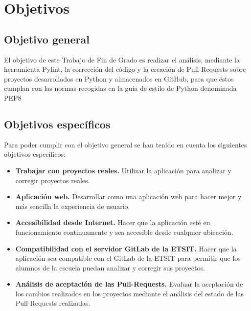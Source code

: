 \documentclass[a4paper, 12pt]{book}
\begin{document}

\cleardoublepage %
\chapter{Objetivos} %
\label{chap:objetivos} %

\section{Objetivo general} %
\label{sec:objetivo-general} %

El objetivo de este Trabajo de Fin de Grado es realizar el análisis, mediante la herramienta Pylint, la corrección del código y la creación de Pull-Requests sobre proyectos desarrollados en Python y almacenados en GitHub, para que éstos cumplan con las normas recogidas en la guía de estilo de Python denominada PEP8

\section{Objetivos específicos}
\label{sec:objetivos-especificos}

Para poder cumplir con el objetivo general se han tenido en cuenta los siguientes objetivos específicos:

\begin{itemize}
	\item \textbf{Trabajar con proyectos reales.} Utilizar la aplicación para analizar y corregir proyectos reales.
	\item \textbf{Aplicación web.} Desarrollar como una aplicación web para hacer mejor y más sencilla la experiencia de usuario.
	\item \textbf{Accesibilidad desde Internet.} Hacer que la aplicación esté en funcionamiento continuamente y sea accesible desde cualquier ubicación.
	\item \textbf{Compatibilidad con el servidor GitLab de la ETSIT.} Hacer que la aplicación sea compatible con el GitLab de la ETSIT para permitir que los alumnos de la escuela puedan analizar y corregir sus proyectos.
	\item \textbf{Análisis de aceptación de las Pull-Requests.} Evaluar la aceptación de los cambios realizados en los proyectos mediante el análisis del estado de las Pull-Requests realizadas.
\end{itemize}
\end{document}
